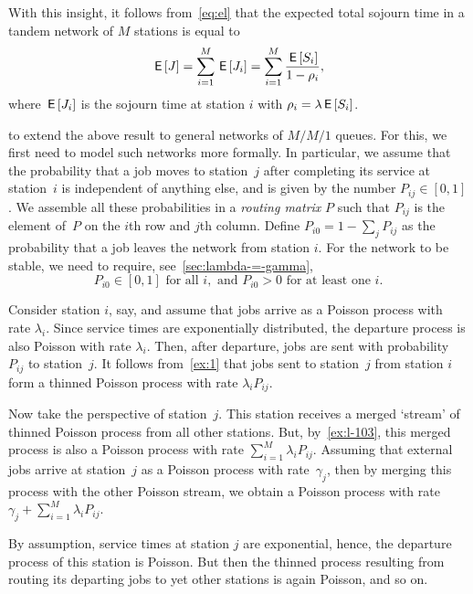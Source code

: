 With this insight, it follows from~\cref{eq:el} that the expected total sojourn time in a tandem network of $M$ stations is equal to
\begin{equation*}
  \,\mathsf{E}\left[J\right] = \sum_{i=1}^{M}\,\mathsf{E}\left[J_i\right] = \sum_{i=1}^M \frac{\,\mathsf{E}\left[S_i\right]}{1-\rho_i},
\end{equation*}
where $\,\mathsf{E}\left[J_i\right]$ is the sojourn time at station $i$ with $\rho_i = \lambda \,\mathsf{E}\left[S_i\right]$.



 to extend the above result to general networks of $M/M/1$ queues.
For this, we first need to model such networks more formally.
In particular, we assume that the probability that a job moves to station~$j$ after completing its service at station~$i$ is independent of anything else, and is given by the number $P_{i j}\in[0,1]$.
We assemble all these probabilities in a \emph{routing matrix} $P$ such that $P_{i j}$ is the element of~$P$ on the $i$th row and $j$th column.
Define $P_{i0} = 1-\sum_{j}P_{ij}$ as the probability that a job leaves the network from station $i$.
For the network to be stable, we need to require, see~\cref{sec:lambda-=-gamma},
\begin{equation}  \label{eq:34}
P_{i0}\in [0, 1] \text{ for all } i, \text{ and } P_{i0} > 0 \text{ for at least one } i.
\end{equation}

Consider station $i$, say, and assume that jobs arrive as a Poisson process with rate $\lambda_i$.
Since service times are exponentially distributed, the departure process is also Poisson with rate $\lambda_i$.
Then, after departure, jobs are sent with probability $P_{i j}$ to station~$j$.
It follows from~\cref{ex:1} that jobs sent to station~$j$ from station $i$ form a thinned Poisson process with rate $\lambda_i P_{i j}$.

Now take the perspective of station~$j$.
This station receives a merged `stream' of thinned Poisson process from all other stations.
But, by~\cref{ex:l-103}, this merged process is also a Poisson process with rate $\sum_{i=1}^{M}\lambda_i P_{ij}$.
Assuming that external jobs arrive at station~$j$ as a Poisson process with rate~$\gamma_j$, then by
merging this process with the other Poisson stream, we obtain a Poisson process with rate $\gamma_j + \sum_{i=1}^M \lambda_i P_{i j}$.

By assumption, service times at station $j$ are exponential, hence, the departure process of this station is Poisson.
But then the thinned process resulting from routing its departing jobs to yet other stations is again Poisson, and so on.

